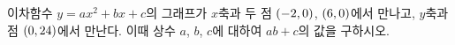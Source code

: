 \hspace*{2mm}\begin{minipage}[t]{\dimexpr\linewidth-2mm\relax}\vspace{0pt}
이차함수 $y=ax^2+bx+c$의 그래프가 $x$축과 두 점 $(-2{,}\mkern3mu 0)$, $(6{,}\mkern3mu 0)$에서 만나고, $y$축과 점 $(0{,}\mkern3mu 24)$에서 만난다. 이때 상수 $a$, $b$, $c$에 대하여 $ab+c$의 값을 구하시오.\end{minipage}
